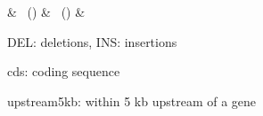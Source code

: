 \documentclass[convert]{standalone}
\begin{document}

	\begin{threeparttable}\small

		{}%
		{\feature & \DEL~(\DELprop) & \INS~(\INSprop) & \centering \gprop \arraybackslash}

			   \begin{tablenotes}\footnotesize
			   \item{ } DEL: deletions, INS: insertions
			   \item{ } cds: coding sequence
			   \item{ } upstream5kb: within 5 kb upstream of a gene
			   \end{tablenotes}

	\end{threeparttable}
\end{document}

